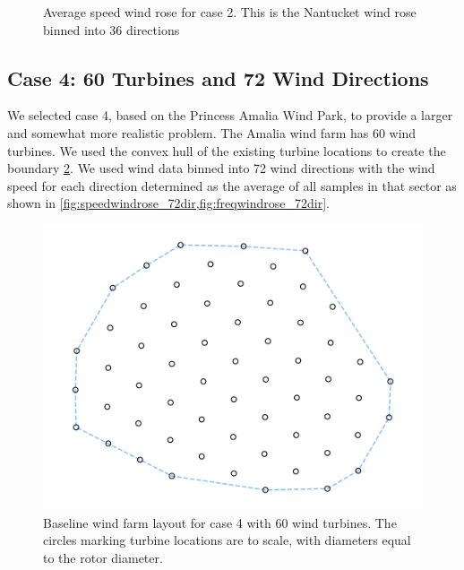 \documentclass[journal abbreviation, manuscript]{copernicus}
\begin{document}
\begin{figure}[h!]
\begin{minipage}[t]{18pc}
			\caption{Average speed wind rose for case 2. This is the Nantucket wind rose binned into 36 directions \cite{wrcc2017}}
			\label{fig:speedwindrose_36dir}
		\end{minipage}
	\end{figure}
	
	\subsection{Case 4: 60 Turbines and 72 Wind Directions}
	We selected case 4, based on the Princess Amalia Wind Park, to provide a larger and somewhat more realistic problem. The Amalia wind farm has 60 wind turbines. We used the convex hull of the existing turbine locations to create the boundary \ref{fig:layout4}. We used wind data binned into 72 wind directions with the wind speed for each direction determined as the average of all samples in that sector as shown in \ref{fig:speedwindrose_72dir,fig:freqwindrose_72dir}.
	\begin{figure}[h!]
		\centering
		\begin{minipage}[t]{18pc}
			\centering
			\includegraphics[width=1.\textwidth, trim={1.0cm, 0cm, 1.0cm, 0cm}, clip]{final_images/layouts/60_turb_start.pdf}
			\caption{Baseline wind farm layout for case 4 with 60 wind turbines. The circles marking turbine locations are to scale, with diameters equal to the rotor diameter.}
			\label{fig:layout4}
		\end{minipage}\hspace{1pc}%
	\end{figure}
	
\end{document}
